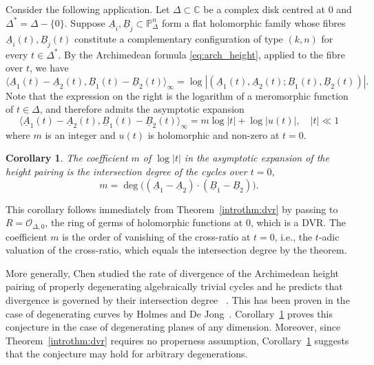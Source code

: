 \documentclass[11pt,a4paper]{amsart}
\newcommand{\C}{\mathbb{C}}
\newcommand{\pn}{\mathbb{P}^{n}}
\theoremstyle{plain}
\newtheorem{corBprime}{Corollary}          %
\theoremstyle{definition}
\theoremstyle{remark}
\newcommand{\set}[1]{\{ #1 \}}
\newcommand{\co}{\mathcal{O}}
\begin{document}
Consider the following application. Let $\Delta \subset \C$ be a complex disk centred at $0$ and $\Delta^* = \Delta - \set{0}$. Suppose $\underline A_i,\underline B_j \subset \pn_\Delta$ form a flat holomorphic family whose fibres $\underline A_i(t),\underline B_j(t)$ constitute a complementary configuration of type $(k,n)$ for every $t\in\Delta^*$. By the Archimedean formula \eqref{eq:arch_height}, applied to the fibre over $t$, we have
\[
\langle\underline A_1(t)-\underline A_2(t),\underline B_1(t)-\underline B_2(t) \rangle_\infty = \log|(\underline A_1(t),\underline A_2(t);\underline B_1(t),\underline B_2(t))|.
\]
Note that the expression on the right is the logarithm of a meromorphic function of $t \in \Delta$, and therefore admits the asymptotic expansion 
\begin{equation}\label{eq:arch_divergence}
  \langle\underline A_1(t)-\underline A_2(t),\underline B_1(t)-\underline B_2(t) \rangle_\infty = m \log|t| + \log |u(t)|, \quad |t| \ll 1
\end{equation}
where $m$ is an integer and $u(t)$ is holomorphic and non-zero at $t=0$.

\begin{corBprime}\label{introcor:asymptotics}
    The coefficient $m$ of $\log|t|$ in the asymptotic expansion of the height pairing is the intersection degree of the cycles over $t=0$,
    \[
    m = \deg\big((\underline A_1-\underline A_2)\cdot(\underline B_1-\underline B_2)\big).
    \]
\end{corBprime}
This corollary follows immediately from Theorem~\ref{introthm:dvr} by passing to $R=\co_{\Delta,0}$, the ring of germs of holomorphic functions at $0$, which is a DVR.  The coefficient $m$ is the order of vanishing of the cross-ratio at $t=0$, i.e., the $t$-adic valuation of the cross-ratio, which equals the intersection degree by the theorem.

More generally, Chen studied the rate of divergence of the Archimedean height pairing of properly degenerating algebraically trivial cycles and he predicts that divergence is governed by their intersection degree
~\cite[Conjecture~1.5]{Chen2025}. This has been proven in the case of degenerating curves by Holmes and De Jong~\cite{HolmesDeJong2015}. Corollary~\ref{introcor:asymptotics} proves this conjecture in the case of degenerating planes of any dimension. Moreover, since Theorem~\ref{introthm:dvr} requires no properness assumption, Corollary~\ref{introcor:asymptotics} suggests that the conjecture may hold for arbitrary degenerations. 
\end{document}
